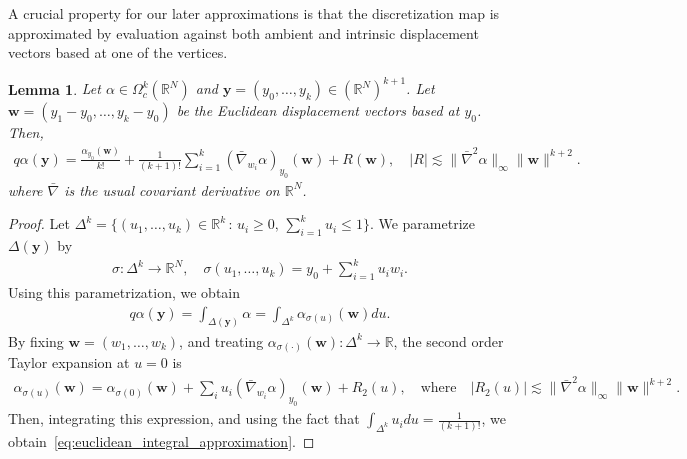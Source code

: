 \documentclass[11pt,reqno]{amsproc}
\numberwithin{equation}{section}
\newcommand{\R}{\mathbb{R}}
\newcommand{\by}{\mathbf{y}}
\newcommand{\bw}{\mathbf{w}}
\newcommand{\ls}{\lesssim}
\newtheorem{lemma}[counter]{Lemma}
\theoremstyle{definition}
\theoremstyle{plain}
\begin{document}
    A crucial property for our later approximations is that the discretization map is approximated by evaluation against both ambient and intrinsic displacement vectors based at one of the vertices. 

    \begin{lemma} \label{lem:euclidean_simplex_integral}
        Let $\alpha \in \Omega^k_c(\R^N)$ and $\by = (y_0, \ldots, y_k) \in (\R^N)^{k+1}$. Let $\bw = (y_1 - y_0, \ldots, y_k - y_0)$ be the Euclidean displacement vectors based at $y_0$. Then,
        \begin{align} \label{eq:euclidean_integral_approximation}
            q\alpha(\by) = \frac{\alpha_{y_0}(\bw)}{k!} + \frac{1}{(k+1)!} \sum_{i=1}^k (\bar\nabla_{w_i} \alpha)_{y_0}(\bw) + R(\bw), \quad |R| \ls \|\bar\nabla^2 \alpha\|_\infty \|\bw\|^{k+2}.
        \end{align} where $\bar\nabla$ is the usual covariant derivative on $\R^N$.
    \end{lemma}
    \begin{proof}
        Let $\Delta^k = \{ (u_1, \ldots, u_k) \in \R^k \, : \, u_i\geq 0, \, \sum_{i=1}^k u_i \leq 1 \}$. We parametrize $\Delta(\by)$ by 
        \begin{align}
            \sigma: \Delta^k \to \R^N, \quad \sigma(u_1, \ldots, u_k) = y_0 + \sum_{i=1}^k u_i w_i.
        \end{align}
        Using this parametrization, we obtain
        \begin{align}
            q\alpha(\by) = \int_{\Delta(\by)} \alpha = \int_{\Delta^k} \alpha_{\sigma(u)}(\bw) du.
        \end{align}
        By fixing $\bw = (w_1, \ldots, w_k)$, and treating $\alpha_{\sigma(\cdot)}(\bw) : \Delta^k \to \R$, the second order Taylor expansion at $u=0$ is
        \begin{align}
            \alpha_{\sigma(u)}(\bw) = \alpha_{\sigma(0)}(\bw) + \sum_{i} u_i (\bar\nabla_{w_i} \alpha)_{y_0}(\bw) + R_2(u), \quad \text{where} \quad |R_2(u)| \ls \|\bar\nabla^2 \alpha\|_\infty \|\bw\|^{k+2}.
        \end{align}
        Then, integrating this expression, and using the fact that $\int_{\Delta^k} u_i du = \frac{1}{(k+1)!}$, we obtain~\eqref{eq:euclidean_integral_approximation}.
    \end{proof}
\end{document}
